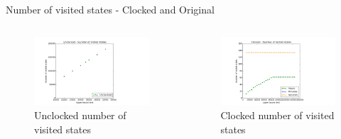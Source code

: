 \documentclass[11pt]{beamer}
\begin{document}
%

\begin{frame}{Number of visited states - Clocked and Original}
         \begin{columns}[t, totalwidth=1.02\textwidth]
             \begin{column}{0.50\linewidth}
\begin{figure}[!ht]
     \centering
     \includegraphics[scale=0.28]{figures/unclocked_states.png}
     \caption{Unclocked number of visited states}
\end{figure}
             \end{column}

             \begin{column}{0.50\linewidth}
\begin{figure}[!ht]
     \centering
     \includegraphics[scale=0.28]{figures/clocked_states.png}
     \caption{Clocked number of visited states}
\end{figure}
             \end{column}

         \end{columns}
\end{frame}
\end{document}
